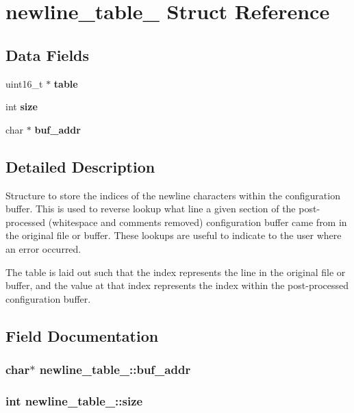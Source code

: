 \section{newline\_\-table\_\- Struct Reference}
\label{structnewline__table__}
\subsection*{Data Fields}
\begin{CompactItemize}
\item 
uint16\_\-t $\ast$ \bf{table}
\item 
int \bf{size}
\item 
char $\ast$ \bf{buf\_\-addr}
\end{CompactItemize}


\subsection{Detailed Description}
Structure to store the indices of the newline characters within the configuration buffer. This is used to reverse lookup what line a given section of the post-processed (whitespace and comments removed) configuration buffer came from in the original file or buffer. These lookups are useful to indicate to the user where an error occurred.

The table is laid out such that the index represents the line in the original file or buffer, and the value at that index represents the index within the post-processed configuration buffer. 



\subsection{Field Documentation}
\subsubsection{\setlength{\rightskip}{0pt plus 5cm}char$\ast$ \bf{newline\_\-table\_\-::buf\_\-addr}}\label{structnewline__table___52c9be19ab5c790b3b1bf4f578b87c99}


\subsubsection{\setlength{\rightskip}{0pt plus 5cm}int \bf{newline\_\-table\_\-::size}}\label{structnewline__table___ae43fca7f0a07ddd9d47c386ae49e310}


